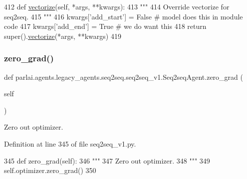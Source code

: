 \begin{DoxyCode}
412     \textcolor{keyword}{def }\hyperlink{namespaceparlai_1_1agents_1_1drqa_1_1utils_a5c76cc39e3014c7bcf9199d566dbdc0f}{vectorize}(self, *args, **kwargs):
413         \textcolor{stringliteral}{"""}
414 \textcolor{stringliteral}{        Override vectorize for seq2seq.}
415 \textcolor{stringliteral}{        """}
416         kwargs[\textcolor{stringliteral}{'add\_start'}] = \textcolor{keyword}{False}  \textcolor{comment}{# model does this in module code}
417         kwargs[\textcolor{stringliteral}{'add\_end'}] = \textcolor{keyword}{True}  \textcolor{comment}{# we do want this}
418         \textcolor{keywordflow}{return} super().\hyperlink{namespaceparlai_1_1agents_1_1drqa_1_1utils_a5c76cc39e3014c7bcf9199d566dbdc0f}{vectorize}(*args, **kwargs)
419 
\end{DoxyCode}
\mbox{\label{classparlai_1_1agents_1_1legacy__agents_1_1seq2seq_1_1seq2seq__v1_1_1Seq2seqAgent_af2e9c4d06f55802308dbfedfea69d0cd}} 
\subsubsection{\texorpdfstring{zero\+\_\+grad()}{zero\_grad()}}
{\footnotesize\ttfamily def parlai.\+agents.\+legacy\+\_\+agents.\+seq2seq.\+seq2seq\+\_\+v1.\+Seq2seq\+Agent.\+zero\+\_\+grad (\begin{DoxyParamCaption}\item[{}]{self }\end{DoxyParamCaption})}

\begin{DoxyVerb}Zero out optimizer.
\end{DoxyVerb}
 

Definition at line 345 of file seq2seq\+\_\+v1.\+py.


\begin{DoxyCode}
345     \textcolor{keyword}{def }zero\_grad(self):
346         \textcolor{stringliteral}{"""}
347 \textcolor{stringliteral}{        Zero out optimizer.}
348 \textcolor{stringliteral}{        """}
349         self.optimizer.zero\_grad()
350 
\end{DoxyCode}


